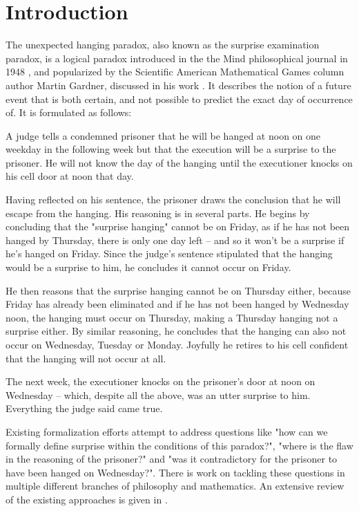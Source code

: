 \documentclass[runningheads]{llncs}
\newenvironment{myindent}{\begin{adjustwidth}{1cm}{}}{\end{adjustwidth}}
\begin{document}
\section{Introduction}

The unexpected hanging paradox, also known as the surprise examination paradox,
is a logical paradox introduced in the the Mind philosophical journal in 1948 \cite{original},
and popularized by the Scientific American Mathematical
Games column author Martin Gardner, discussed in his work \cite{diversions}.
It describes the notion of a future event that
is both certain, and not possible to predict the exact day of occurrence of. It is
formulated as follows: \newline

\begin{myindent}
  A judge tells a condemned prisoner that he will be hanged at noon on one weekday
  in the following week but that the execution will be a surprise to the prisoner.
  He will not know the day of the hanging until the executioner knocks on his cell door at noon that day.

  Having reflected on his sentence, the prisoner draws the conclusion that he will
  escape from the hanging. His reasoning is in several parts. He begins by concluding
  that the "surprise hanging" cannot be on Friday, as if he has not been hanged by
  Thursday, there is only one day left – and so it won't be a surprise if he's hanged on
  Friday. Since the judge's sentence stipulated that the hanging would be a surprise
  to him, he concludes it cannot occur on Friday.

  He then reasons that the surprise hanging cannot be on Thursday either, because
  Friday has already been eliminated and if he has not been hanged by Wednesday noon,
  the hanging must occur on Thursday, making a Thursday hanging not a surprise either.
  By similar reasoning, he concludes that the hanging can also not occur on Wednesday,
  Tuesday or Monday. Joyfully he retires to his cell confident that the hanging will
  not occur at all.

  The next week, the executioner knocks on the prisoner's door at noon on Wednesday –
  which, despite all the above, was an utter surprise to him. Everything the judge said came true. \newline
\end{myindent}

 Existing formalization efforts attempt to address questions like "how can we formally
define surprise within the conditions of this paradox?", "where is the flaw in the
reasoning of the prisoner?" and "was it contradictory for the prisoner to have been
hanged on Wednesday?". There is work on tackling these questions in multiple
different branches of philosophy and mathematics.
An extensive review of the existing approaches is given in \cite{extensivereview}.
\end{document}
